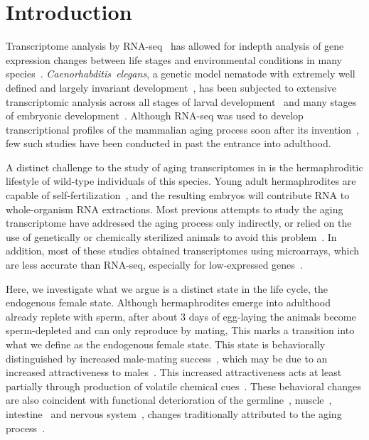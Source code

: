 \section*{Introduction}

Transcriptome analysis by RNA-seq~\citep{Mortazavi2008} has allowed for indepth
analysis of gene expression changes between life stages and environmental
conditions in many species~\citep{Gerstein2014,Blaxter2012}.
\emph{Caenorhabditis~elegans}, a genetic model nematode with extremely
well defined and largely invariant development~\citep{Sulston1977,Sulston1983},
has been subjected to extensive transcriptomic analysis across all stages of
larval development~\citep{Hillier2009,Boeck2016,Murray2012}
and many stages of embryonic development~\citep{Boeck2016}. Although RNA-seq was
used to develop transcriptional profiles of the mammalian aging process soon
after its invention~\citep{Magalhaes2010}, few such studies have been conducted
in \cel{} past the entrance into adulthood.

A distinct challenge to the study of aging transcriptomes in \cel{} is the
hermaphroditic lifestyle of wild-type individuals of this species. Young adult
hermaphrodites are capable of self-fertilization~\citep{Brenner1974,Corsi2015},
and the resulting embryos will contribute RNA to whole-organism RNA extractions.
Most previous attempts to study the \cel{} aging transcriptome have addressed
the aging process only indirectly, or relied on the use of genetically or
chemically sterilized animals to avoid this problem~\citep{Murphy2003,
Halaschek-wiener2005,Lund2002,McCormick2012,Eckley2013,Boeck2016,Rangaraju2015}.
In addition, most of these studies obtained transcriptomes using microarrays,
which are less accurate than RNA-seq, especially for low-expressed
genes~\citep{Wang2014}.

Here, we investigate what we argue is a distinct state in the \cel{} life cycle,
the endogenous female state. Although \cel{} hermaphrodites emerge into adulthood
already replete with sperm, after about 3 days of egg-laying the animals become
sperm-depleted and can only reproduce by mating, This marks a transition into
what we define as the endogenous female state. This state is behaviorally
distinguished by increased male-mating success~\citep{Garcia2007}, which may be
due to an increased attractiveness to males~\citep{Morsci2011}. This increased
attractiveness acts at least partially through production of volatile chemical
cues~\citep{Leighton2014}.
These behavioral changes are also coincident with functional deterioration of
the germline~\citep{Andux2008}, muscle~\citep{Herndon2002},
intestine~\citep{McGee2011} and nervous system~\citep{Liu2013}, changes
traditionally attributed to the aging process~\citep{Golden2007}.

